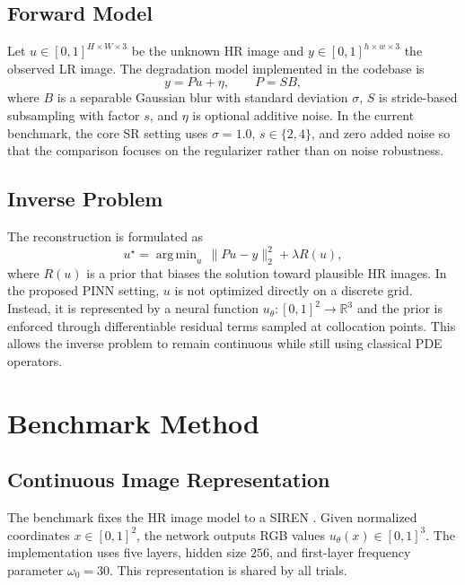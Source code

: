 \documentclass[conference]{IEEEtran}
\newcommand{\Real}{\mathbb{R}}
\newcommand{\net}{u_{\theta}}
\DeclareMathOperator*{\argmin}{arg\,min}
\begin{document}
\subsection{Forward Model}
Let $u \in [0,1]^{H \times W \times 3}$ be the unknown HR image and
$y \in [0,1]^{h \times w \times 3}$ the observed LR image. The
degradation model implemented in the codebase is
\begin{equation}
    y = P u + \eta, \qquad P = S B,
    \label{eq:forward}
\end{equation}
where $B$ is a separable Gaussian blur with standard deviation
$\sigma$, $S$ is stride-based subsampling with factor $s$, and $\eta$
is optional additive noise. In the current benchmark, the core SR
setting uses $\sigma = 1.0$, $s \in \{2,4\}$, and zero added noise so
that the comparison focuses on the regularizer rather than on noise
robustness.

\subsection{Inverse Problem}
The reconstruction is formulated as
\begin{equation}
    u^\star = \argmin_u \, \|P u - y\|_2^2 + \lambda R(u),
    \label{eq:energy}
\end{equation}
where $R(u)$ is a prior that biases the solution toward plausible HR
images. In the proposed PINN setting, $u$ is not optimized directly on
a discrete grid. Instead, it is represented by a neural function
$\net : [0,1]^2 \rightarrow \Real^3$ and the prior is enforced through
differentiable residual terms sampled at collocation points. This
allows the inverse problem to remain continuous while still using
classical PDE operators.

\section{Benchmark Method}
\subsection{Continuous Image Representation}
The benchmark fixes the HR image model to a SIREN
\cite{sitzmann2020siren}. Given normalized coordinates
$x \in [0,1]^2$, the network outputs RGB values
$\net(x) \in [0,1]^3$. The implementation uses five layers, hidden size
$256$, and first-layer frequency parameter $\omega_0 = 30$. This
representation is shared by all trials.
\end{document}

